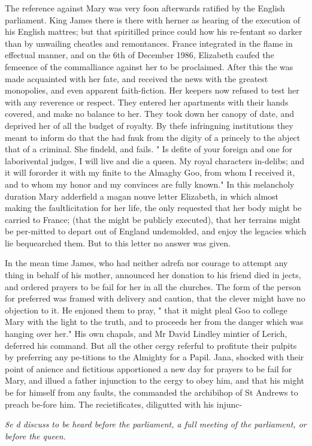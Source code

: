 The reference against Mary was very foon afterwards ratified by the English parliament. King James there is there with herner as hearing of the execution of his English mattres; but that spiritilled prince could how his re-fentant so darker than by unwailing cheatles and remontances. France integrated in the flame in effectual manner, and on the 6th of December 1986, Elizabeth caufed the femeence of the commalliance against her to be proclaimed. After this the was made acquainted with her fate, and received the news with the greatest monopolies, and even apparent faith-fiction. Her keepers now refused to test her with any reverence or respect. They entered her apartments with their hands covered, and make no balance to her. They took down her canopy of date, and deprived her of all the budget of royalty. By thefe infringning institutions they meant to inform do that the had fnuk from the digity of a princely to the abject that of a criminal. She findeld, and fails. " Is defite of your foreign and one for laborivental judges, I will live and die a queen. My royal characters in-delibs; and it will fororder it with my finite to the Almaghy Goo, from whom I received it, and to whom my honor and my convinces are fully known." In this melancholy duration Mary adderfield a magan nouve letter Elizabeth, in which almost making the faultlicitation for her life, the only requested that her body might be carried to France; (that the might be publicly executed), that her terrains might be per-mitted to depart out of England undemolded, and enjoy the legacies which lie bequearched them. But to this letter no answer was given.\par\medskip
In the mean time James, who had neither adrefa nor courage to attempt any thing in behalf of his mother, announced her donation to his friend died in jects, and ordered prayers to be fail for her in all the churches. The form of the person for preferred was framed with delivery and caution, that the clever might have no objection to it. He enjoned them to pray, " that it might pleal Goo to college Mary with the light to the truth, and to proceeds her from the danger which was hanging over her." His own chapals, and Mr David Lindley mintier of Lerich, deferred his command. But all the other cergy referful to profitute their pulpits by preferring any pe-titions to the Almighty for a Papil. Jana, shocked with their point of anience and fictitious apportioned a new day for prayers to be fail for Mary, and illued a father injunction to the cergy to obey him, and that his might be for himself from any faults, the commanded the archibihop of St Andrews to preach be-fore him. The recietificates, diligutted with his injunc-\par\medskip
{\small\itshape 8e d discuss to be heard before the parliament, a full meeting of the parliament, or before the queen.\par}\medskip
